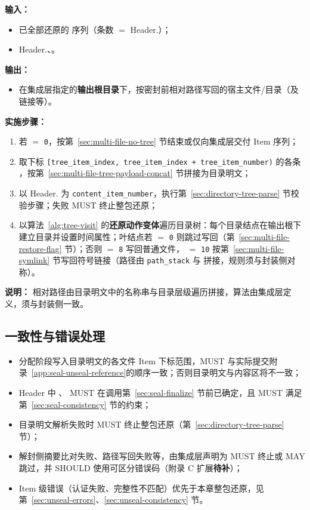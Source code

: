 \textbf{输入：}
\begin{itemize}
  \item 已全部还原的  序列（条数 $=$ Header.）；
  \item Header.、。
\end{itemize}

\textbf{输出：}
\begin{itemize}
  \item 在集成层指定的\textbf{输出根目录}下，按密封前相对路径写回的宿主文件/目录（及链接等）。
\end{itemize}

\textbf{实施步骤：}
\begin{enumerate}
  \item 若  $=$ \texttt{0}，按第~\ref{sec:multi-file-no-tree} 节结束或仅向集成层交付 Item 序列；
  \item 取下标 \texttt{[tree\_item\_index,\ tree\_item\_index + tree\_item\_number)} 的各条 ，按第~\ref{sec:multi-file-tree-payload-concat} 节拼接为目录明文；
  \item 以 Header. 为 \texttt{content\_item\_number}，执行第~\ref{sec:directory-tree-parse} 节校验步骤；失败 MUST 终止整包还原；
  \item 以算法~\ref{alg:tree-visit} 的\textbf{还原动作变体}遍历目录树：每个目录结点在输出根下建立目录并设置时间属性；叶结点若  $=$ \texttt{0} 则跳过写回（第~\ref{sec:multi-file-restore-flag} 节）；否则  $=$ \texttt{8} 写回普通文件， $=$ \texttt{10} 按第~\ref{sec:multi-file-symlink} 节写回符号链接（路径由 \texttt{path\_stack} 与  拼接，规则须与封装侧对称）。
\end{enumerate}

\textbf{说明：}
相对路径由目录明文中的名称串与目录层级遍历拼接，算法由集成层定义，须与封装侧一致。

\subsection{一致性与错误处理}\label{sec:multi-file-consistency}

\begin{itemize}
  \item 分配阶段写入目录明文的各文件 Item 下标范围，MUST 与实际提交附录~\ref{app:seal-unseal-reference}的顺序一致；否则目录明文与内容区将不一致；
  \item Header 中 、 MUST 在调用第~\ref{sec:seal-finalize} 节前已确定，且 MUST 满足第~\ref{sec:seal-consistency} 节的约束；
  \item 目录明文解析失败时 MUST 终止整包还原（第~\ref{sec:directory-tree-parse} 节）；
  \item 解封侧摘要比对失败、路径写回失败等，由集成层声明为 MUST 终止或 MAY 跳过，并 SHOULD 使用可区分错误码（附录 C 扩展\textbf{待补}）；
  \item Item 级错误（认证失败、完整性不匹配）优先于本章整包还原，见第~\ref{sec:unseal-errors}、\ref{sec:unseal-consistency} 节。
\end{itemize}

